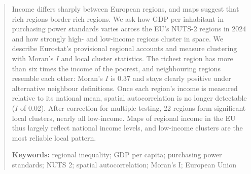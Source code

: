 \begin{abstract}
\noindent Income differs sharply between European regions, and maps suggest that rich regions border rich regions. We ask how GDP per inhabitant in purchasing power standards varies across the EU's NUTS-2 regions in 2024 and how strongly high- and low-income regions cluster in space. We describe Eurostat's provisional regional accounts and measure clustering with Moran's $I$ and local cluster statistics. The richest region has more than six times the income of the poorest, and neighbouring regions resemble each other: Moran's $I$ is 0.37 and stays clearly positive under alternative neighbour definitions.
Once each region's income is measured relative to its national mean, spatial autocorrelation is no longer detectable ($I$ of 0.02).
After correction for multiple testing, 22 regions form significant local clusters, nearly all low-income.
Maps of regional income in the EU thus largely reflect national income levels, and low-income clusters are the most reliable local pattern.

\medskip
\noindent\textbf{Keywords:} regional inequality; GDP per capita; purchasing power standards; NUTS 2; spatial autocorrelation; Moran's I; European Union
\end{abstract}
